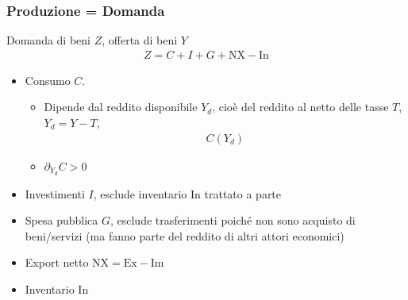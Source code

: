 \documentclass[letterpaper,10pt,italian]{jupyterBook}
\begin{document}
\subsubsection{Produzione = Domanda}
\label{\detokenize{ch/macro:produzione-domanda}}\label{\detokenize{ch/macro:economics-hs-macro-short-run-goods-market-y-z}}
\sphinxAtStartPar
Domanda di beni \(Z\), offerta di beni \(Y\)
\begin{equation*}
\begin{split}Z = C + I + G + \text{NX} - \text{In}\end{split}
\end{equation*}\begin{itemize}
\item {} 
\sphinxAtStartPar
Consumo \(C\).
\begin{itemize}
\item {} 
\sphinxAtStartPar
Dipende dal reddito disponibile \(Y_d\), cioè del reddito al netto delle tasse \(T\), \(Y_d = Y - T\),
\begin{equation*}
\begin{split}C(Y_d)\end{split}
\end{equation*}
\item {} 
\sphinxAtStartPar
\(\partial_{Y_d} C > 0\)

\end{itemize}

\item {} 
\sphinxAtStartPar
Investimenti \(I\), esclude inventario \(\text{In}\) trattato a parte

\item {} 
\sphinxAtStartPar
Spesa pubblica \(G\), esclude trasferimenti poiché non sono acquisto di beni/servizi (ma fanno parte del reddito di altri attori economici)

\item {} 
\sphinxAtStartPar
Export netto \(\text{NX} = \text{Ex} - \text{Im}\)

\item {} 
\sphinxAtStartPar
Inventario \(\text{In}\)

\end{itemize}
\end{document}

